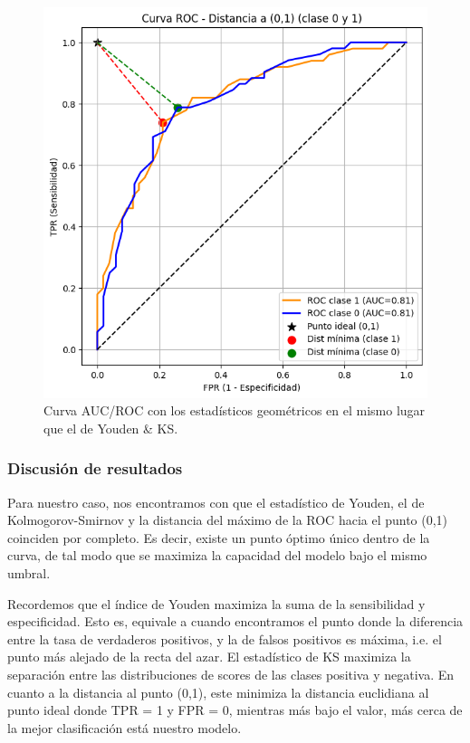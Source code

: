         \begin{figure}[h!]
            \centering
            \includegraphics[width=0.7\linewidth]{Images/dist-geom-roc.png}
            \caption{Curva AUC/ROC con los estadísticos geométricos en el mismo lugar que el de Youden \& KS.}
            \label{fig:geom-roc}
        \end{figure}

    \subsubsection{Discusión de resultados}

        Para nuestro caso, nos encontramos con que el estadístico de Youden, el de Kolmogorov-Smirnov y 
        la distancia del máximo de la ROC hacia el punto (0,1) coinciden por completo. Es decir, existe
        un punto óptimo único dentro de la curva, de tal modo que se maximiza la capacidad del modelo 
        bajo el mismo umbral. 

        Recordemos que el índice de Youden maximiza la suma de la sensibilidad y especificidad. Esto es,
        equivale a cuando encontramos el punto donde la diferencia entre la tasa de verdaderos positivos, y la
        de falsos positivos es máxima, i.e. el punto más alejado de la recta del azar. El estadístico de
        KS maximiza la separación entre las distribuciones de scores de las clases positiva y negativa. En
        cuanto a la distancia al punto (0,1), este minimiza la distancia euclidiana al punto ideal donde TPR = 1 
        y FPR = 0, mientras más bajo el valor, más cerca de la mejor clasificación está nuestro modelo. 

